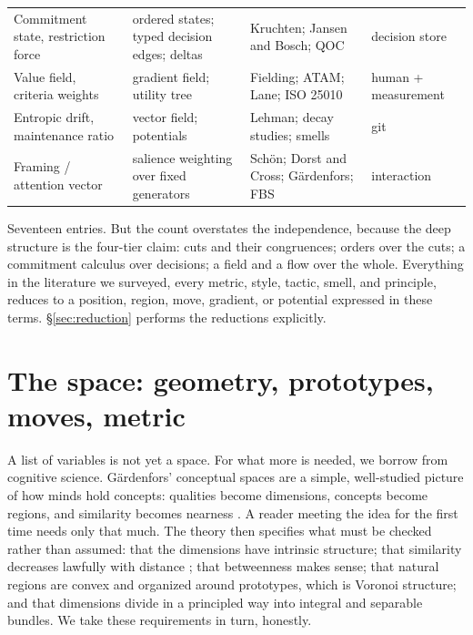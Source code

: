 \documentclass[11pt,oneside]{article}
\theoremstyle{definition}
\begin{document}
\begin{center}
\begin{longtable}{@{}p{}p{}p{}p{}@{}}
Commitment state, restriction force & ordered states; typed decision edges; deltas & Kruchten; Jansen and Bosch; QOC & decision store \\
Value field, criteria weights & gradient field; utility tree & Fielding; ATAM; Lane; ISO 25010 & human + measurement \\
Entropic drift, maintenance ratio & vector field; potentials & Lehman; decay studies; smells & git \\
Framing / attention vector & salience weighting over fixed generators & Schön; Dorst and Cross; Gärdenfors; FBS & interaction \\
\bottomrule
\end{longtable}
\end{center}

Seventeen entries. But the count overstates the independence, because the deep structure is the
four-tier claim: cuts and their congruences; orders over the cuts; a commitment calculus over
decisions; a field and a flow over the whole. Everything in the literature we surveyed, every
metric, style, tactic, smell, and principle, reduces to a position, region, move, gradient, or
potential expressed in these terms. \S\ref{sec:reduction} performs the reductions explicitly.

\section{The space: geometry, prototypes, moves, metric}\label{sec:space}

A list of variables is not yet a space. For what more is needed, we borrow from cognitive
science. G\"ardenfors' conceptual spaces are a simple, well-studied picture of how minds hold
concepts: qualities become dimensions, concepts become regions, and similarity becomes nearness
\cite{gardenfors2000}. A reader meeting the idea for the first time needs only that much. The
theory then specifies what must be checked rather than assumed: that the dimensions have
intrinsic structure; that similarity decreases lawfully with distance \cite{shepard1987}; that
betweenness makes sense; that natural regions are convex and organized around prototypes,
which is Voronoi structure; and that dimensions divide in a principled way into integral and
separable bundles. We take these requirements in turn, honestly.
\end{document}
